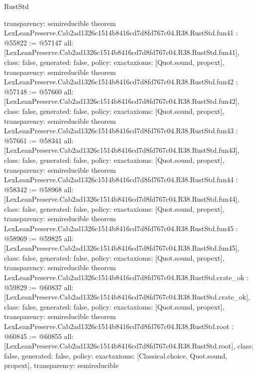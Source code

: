\begin{lexlean}{RustStd}
\begin{coremodule}
{  transparency: semireducible
}
theorem LexLeanPreserve.Cab2ad1326c1514b8416cd7d8fd767c04.R38.RustStd.fun41 : @55822 := @57147 {
  all: [LexLeanPreserve.Cab2ad1326c1514b8416cd7d8fd767c04.R38.RustStd.fun41],
  class: false,
  generated: false,
  policy: exact{axioms: [Quot.sound, propext]},
  transparency: semireducible
}
theorem LexLeanPreserve.Cab2ad1326c1514b8416cd7d8fd767c04.R38.RustStd.fun42 : @57148 := @57660 {
  all: [LexLeanPreserve.Cab2ad1326c1514b8416cd7d8fd767c04.R38.RustStd.fun42],
  class: false,
  generated: false,
  policy: exact{axioms: [Quot.sound, propext]},
  transparency: semireducible
}
theorem LexLeanPreserve.Cab2ad1326c1514b8416cd7d8fd767c04.R38.RustStd.fun43 : @57661 := @58341 {
  all: [LexLeanPreserve.Cab2ad1326c1514b8416cd7d8fd767c04.R38.RustStd.fun43],
  class: false,
  generated: false,
  policy: exact{axioms: [Quot.sound, propext]},
  transparency: semireducible
}
theorem LexLeanPreserve.Cab2ad1326c1514b8416cd7d8fd767c04.R38.RustStd.fun44 : @58342 := @58968 {
  all: [LexLeanPreserve.Cab2ad1326c1514b8416cd7d8fd767c04.R38.RustStd.fun44],
  class: false,
  generated: false,
  policy: exact{axioms: [Quot.sound, propext]},
  transparency: semireducible
}
theorem LexLeanPreserve.Cab2ad1326c1514b8416cd7d8fd767c04.R38.RustStd.fun45 : @58969 := @59825 {
  all: [LexLeanPreserve.Cab2ad1326c1514b8416cd7d8fd767c04.R38.RustStd.fun45],
  class: false,
  generated: false,
  policy: exact{axioms: [Quot.sound, propext]},
  transparency: semireducible
}
theorem LexLeanPreserve.Cab2ad1326c1514b8416cd7d8fd767c04.R38.RustStd.crate_ok : @59829 := @60837 {
  all: [LexLeanPreserve.Cab2ad1326c1514b8416cd7d8fd767c04.R38.RustStd.crate_ok],
  class: false,
  generated: false,
  policy: exact{axioms: [Quot.sound, propext]},
  transparency: semireducible
}
theorem LexLeanPreserve.Cab2ad1326c1514b8416cd7d8fd767c04.R38.RustStd.root : @60845 := @60855 {
  all: [LexLeanPreserve.Cab2ad1326c1514b8416cd7d8fd767c04.R38.RustStd.root],
  class: false,
  generated: false,
  policy: exact{axioms: [Classical.choice, Quot.sound, propext]},
  transparency: semireducible
}


\end{coremodule}
\end{lexlean}
